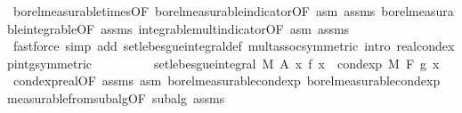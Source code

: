\begin{isabellebody}
\ borel{\isacharunderscore}{\kern0pt}measurable{\isacharunderscore}{\kern0pt}times{\isacharbrackleft}{\kern0pt}OF\ borel{\isacharunderscore}{\kern0pt}measurable{\isacharunderscore}{\kern0pt}indicator{\isacharbrackleft}{\kern0pt}OF\ asm{\isacharbrackright}{\kern0pt}\ assms{\isacharparenleft}{\kern0pt}{}{\isacharparenright}{\kern0pt}{\isacharbrackright}{\kern0pt}\ borel{\isacharunderscore}{\kern0pt}measurable{\isacharunderscore}{\kern0pt}integrable{\isacharbrackleft}{\kern0pt}OF\ assms{\isacharparenleft}{\kern0pt}{}{\isacharparenright}{\kern0pt}{\isacharbrackright}{\kern0pt}\ integrable{\isacharunderscore}{\kern0pt}mult{\isacharunderscore}{\kern0pt}indicator{\isacharbrackleft}{\kern0pt}OF\ asm{\isacharprime}{\kern0pt}\ assms{\isacharparenleft}{\kern0pt}{}{\isacharparenright}{\kern0pt}{\isacharbrackright}{\kern0pt}\ \isamarkupfalse%
\ {\isacharparenleft}{\kern0pt}fastforce\ simp\ add{\isacharcolon}{\kern0pt}\ set{\isacharunderscore}{\kern0pt}lebesgue{\isacharunderscore}{\kern0pt}integral{\isacharunderscore}{\kern0pt}def\ mult{\isachardot}{\kern0pt}assoc{\isacharbrackleft}{\kern0pt}symmetric{\isacharbrackright}{\kern0pt}\ intro{\isacharcolon}{\kern0pt}\ real{\isacharunderscore}{\kern0pt}cond{\isacharunderscore}{\kern0pt}exp{\isacharunderscore}{\kern0pt}intg{\isacharparenleft}{\kern0pt}{}{\isacharparenright}{\kern0pt}{\isacharbrackleft}{\kern0pt}symmetric{\isacharbrackright}{\kern0pt}{\isacharparenright}{\kern0pt}\isanewline
\ \ \ \ \isamarkupfalse%
\ \isamarkupfalse%
\ {\isachardoublequoteopen}{\isachardot}{\kern0pt}{\isachardot}{\kern0pt}{\isachardot}{\kern0pt}\ {\isacharequal}{\kern0pt}\ set{\isacharunderscore}{\kern0pt}lebesgue{\isacharunderscore}{\kern0pt}integral\ M\ A\ {\isacharparenleft}{\kern0pt}{\isasymlambda}x{\isachardot}{\kern0pt}\ f\ x\ {\isacharasterisk}{\kern0pt}\ cond{\isacharunderscore}{\kern0pt}exp\ M\ F\ g\ x{\isacharparenright}{\kern0pt}{\isachardoublequoteclose}\ \isamarkupfalse%
\ cond{\isacharunderscore}{\kern0pt}exp{\isacharunderscore}{\kern0pt}real{\isacharbrackleft}{\kern0pt}OF\ assms{\isacharparenleft}{\kern0pt}{}{\isacharparenright}{\kern0pt}{\isacharbrackright}{\kern0pt}\ asm{\isacharprime}{\kern0pt}\ borel{\isacharunderscore}{\kern0pt}measurable{\isacharunderscore}{\kern0pt}cond{\isacharunderscore}{\kern0pt}exp{\isacharprime}{\kern0pt}\ borel{\isacharunderscore}{\kern0pt}measurable{\isacharunderscore}{\kern0pt}cond{\isacharunderscore}{\kern0pt}exp{}\ measurable{\isacharunderscore}{\kern0pt}from{\isacharunderscore}{\kern0pt}subalg{\isacharbrackleft}{\kern0pt}OF\ subalg\ assms{\isacharparenleft}{\kern0pt}{}{\isacharparenright}{\kern0pt}{\isacharbrackright}{\kern0pt}\ \isamarkupfalse%

\end{isabellebody}
